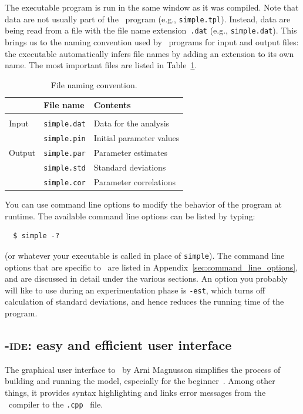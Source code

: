 \documentclass{admbmanual}
\begin{document}
The executable program is run in the same window as it was compiled. Note that
data are not usually part of the \scAB\ program (e.g., \texttt{simple.tpl}).
Instead, data are being read from a file with the file name
extension~\texttt{.dat} (e.g., \texttt{simple.dat}). This brings us to the
naming convention used by \scAB\ programs for input and output files: the
executable automatically infers file names by adding an extension to its own
name. The most important files are listed in Table~\ref{tab:important-files}.
\begin{table}[h]
\begin{center}
\begin{tabular}{@{\vrule height 12pt depth 6pt width0pt} l l l }
\hline
& \textbf{File name} & \textbf{Contents} \\ \hline\\[-17pt]
Input & \texttt{simple.dat} & Data for the analysis \\
& \texttt{simple.pin} & Initial parameter values \\ \hline
Output & \texttt{simple.par} & Parameter estimates \\
& \texttt{simple.std} & Standard deviations \\
& \texttt{simple.cor} & Parameter correlations\\
\hline
\end{tabular}
\end{center}
\caption{File naming convention.}
\label{tab:important-files}
\end{table}
You can use command line options to modify the behavior of the program at
runtime. The available command line options can be listed by typing:
\begin{lstlisting}
  $ simple -?
\end{lstlisting}
(or whatever your executable is called in place of \texttt{simple}). The command
line options that are specific to \scAR\ are listed in
Appendix~\ref{sec:command_line_options}, and are discussed in detail under the
various sections. An option you probably will like to use during an
experimentation phase is \texttt{-est}, which turns off calculation of standard
deviations, and hence reduces the running time of the program.

\subsection{\scAB-\textsc{ide}: easy and efficient user interface}

The graphical user interface to \scAB\ by Arni Magnusson simplifies the process
of building and running the model, especially for the
beginner~\cite{admb_news_july09}. Among other things, it provides syntax
highlighting and links error messages from the \cplus\ compiler to the
\texttt{.cpp}~ file.
\end{document}
